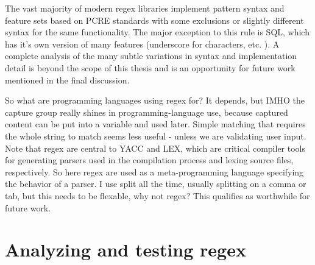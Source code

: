 The vast majority of modern regex libraries implement pattern syntax and feature sets based on PCRE standards with some exclusions or slightly different syntax for the same functionality. The major exception to this rule is SQL, which has it's own version of many features (underscore for characters, etc. ). A complete analysis of the many subtle variations in syntax and implementation detail is beyond the scope of this thesis and is an opportunity for future work mentioned in the final discussion.

 So what are programming languages using regex for?  It depends, but IMHO the capture group really shines in programming-language use, because captured content can be put into a variable and used later.  Simple matching that requires the whole string to match seems less useful - unless we are validating user input.  Note that regex are central to YACC and LEX, which are critical compiler tools for generating parsers used in the compilation process and lexing source files, respectively.  So here regex are used as a meta-programming language specifying the behavior of a parser.  I use split all the time, usually splitting on a comma or tab, but this needs to be flexable, why not regex?  This qualifies as worthwhile for future work.

\section{Analyzing and testing regex}



